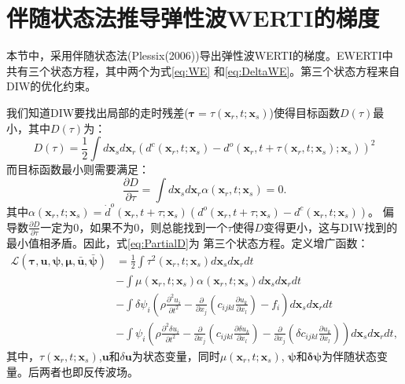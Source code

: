 \chapter{伴随状态法推导弹性波WERTI的梯度}
\label{cha:AdjointForEWERTI}
本节中，采用伴随状态法(Plessix(2006)\cite{plessix2006})导出弹性波WERTI的梯度。EWERTI中共有三个状态方程，其中两个为式\eqref{eq:WE}
和\eqref{eq:DeltaWE}。第三个状态方程来自DIW的优化约束。

我们知道DIW要找出局部的走时残差($\mathbf{\tau}=\tau(\mathbf{x}_r,t;\mathbf{x}_s)$)使得目标函数$D(\tau)$最小，其中$D(\tau)$为：
\begin{equation}
	D(\tau)=\frac{1}{2}\int
	d\mathbf{x}_sd\mathbf{x}_r(d^c(\mathbf{x}_r,t;\mathbf{x}_s)-
	d^o(\mathbf{x}_r,t+\tau(\mathbf{x}_r,t;\mathbf{x}_s);\mathbf{x}_s))^2
        \label{eq:Dl}
\end{equation}
而目标函数最小则需要满足：
\begin{equation}
	\frac{\partial D}{\partial \tau}=\int
	d\mathbf{x}_sd\mathbf{x}_r\alpha(\mathbf{x}_r,t;\mathbf{x}_s)=0.
        \label{eq:PartialD}
\end{equation}
其中$\alpha(\mathbf{x}_r,t;\mathbf{x}_s)=\dot{d}^o(\mathbf{x}_r,t+\tau;\mathbf{x}_s)(d^o(\mathbf{x}_r,t+\tau;\mathbf{x}_s)-
d^c(\mathbf{x}_r,t;\mathbf{x}_s))$。
偏导数$\frac{\partial D}{\partial
\tau}$一定为0，如果不为0，则总能找到一个$\tau$使得$D$变得更小，这与DIW找到的最小值相矛盾。因此，式\eqref{eq:PartialD}为
第三个状态方程。定义增广函数：
\begin{equation}
	\begin{split}
	\mathcal{L}(\mathbf{\tau},\mathbf{u},\mathbf{\psi},\mathbf{\mu},\bar{\mathbf{u}},\bar{\mathbf{\psi}})
	&=\frac{1}{2}\int \tau^2(\mathbf{x}_r,t;\mathbf{x}_s)d\mathbf{x}_sd\mathbf{x}_rdt\\
	&-\int
	\mu(\mathbf{x}_r,t;\mathbf{x}_s)\alpha(\mathbf{x}_r,t;\mathbf{x}_s)d\mathbf{x}_sd\mathbf{x}_rdt\\
	&-\int {\delta \psi_i}\left(\rho\frac{\partial^2 u_i }{\partial
	t^2}-\frac{\partial}{\partial x_j}(c_{ijkl}\frac{\partial u_k}{\partial x_l}) -
	f_i\right)d\mathbf{x}_sd\mathbf{x}_rdt\\
	&-\int \psi_i\left(\rho\frac{\partial^2
	\delta u_i }{\partial t^2}-\frac{\partial}{\partial x_j}(c_{ijkl}\frac{\partial
	\delta u_k}{\partial x_l})-\frac{\partial}{\partial x_j}(\delta
	c_{ijkl}\frac{\partial u_k}{\partial x_l})\right)d\mathbf{x}_sd\mathbf{x}_rdt,
	\end{split}
        \label{eq:Lagrangian}
\end{equation}
其中，$\tau(\mathbf{x}_r,t;\mathbf{x}_s)$,$\mathbf{u}$和$\delta \mathbf{u}$为状态变量，同时$\mu(\mathbf{x}_r,t;\mathbf{x}_s)$, 
$\boldsymbol{\psi}$和$\boldsymbol{\delta\psi}$为伴随状态变量。后两者也即反传波场。

